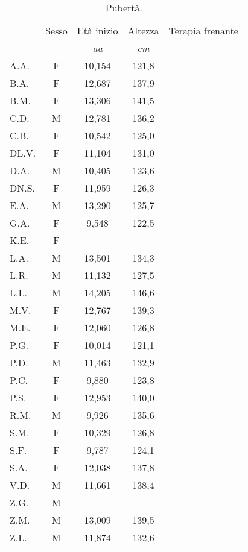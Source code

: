 \begin{table}[!h]
\begin{center}
\begin{tabular}{lcccc}
\toprule
 & Sesso 	& \multicolumn{1}{c}{Età inizio}	& Altezza	& Terapia frenante \\
 & &  \multicolumn{1}{c}{\emph{aa}} 	& \multicolumn{1}{c}{\emph{cm}}			\\
\midrule
A.A.	& F & 10,154 		& 121,8  		& \checkmark \\
B.A.	& F & 12,687 		& 137,9   		&            \\
B.M.	& F & 13,306 		& 141,5   		&            \\
C.D.	& M & 12,781 		& 136,2   		&            \\
C.B.	& F & 10,542 		& 125,0   		& \checkmark \\
DL.V.	& F & 11,104 		& 131,0   		&            \\
D.A.	& M & 10,405 		& 123,6   		& \checkmark \\
DN.S.	& F & 11,959 		& 126,3   		&            \\
E.A.	& M & 13,290 		& 125,7   		&            \\
G.A.	& F &  9,548  		& 122,5   		&            \\
K.E.	& F &        		&    		&            \\
L.A.	& M & 13,501 		& 134,3   		&            \\
L.R.	& M & 11,132 		& 127,5   		&            \\
L.L.	& M & 14,205 		& 146,6   		&            \\
M.V.	& F & 12,767 		& 139,3   		&            \\
M.E.	& F & 12,060 		& 126,8   		&            \\
P.G.	& F & 10,014 		& 121,1   		& \checkmark \\
P.D.	& M & 11,463 		& 132,9   		&            \\
P.C.	& F &  9,880  		& 123,8   		& \checkmark \\
P.S.	& F & 12,953 		& 140,0   		&            \\
R.M.	& M &  9,926  		& 135,6   		& \checkmark \\
S.M.	& F & 10,329 		& 126,8   		& \checkmark \\
S.F.	& F &  9,787  		& 124,1   		&            \\
S.A.	& F & 12,038 		& 137,8   		&            \\
V.D.	& M & 11,661 		& 138,4   		&            \\
Z.G.	& M &      		&    		&            \\
Z.M.	& M & 13,009 		& 139,5   		&            \\
Z.L.	& M & 11,874 		& 132,6   		&            \\
\bottomrule
\end{tabular}
\end{center}
\caption{Pubertà.}
\label{tab:Puberta}
\end{table}


